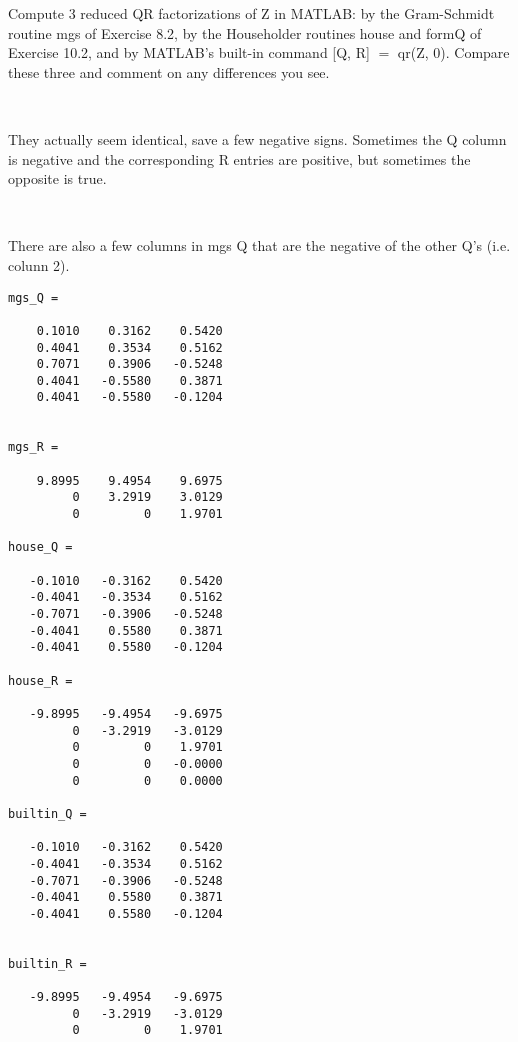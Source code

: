 \documentclass[12pt]{article}
\newcommand{\mt}[1]{\ensuremath{#1}}
\newcommand{\eql}{\mt{=} }
\begin{document}
Compute 3 reduced QR factorizations of Z in MATLAB: by the Gram-Schmidt routine mgs of Exercise 8.2, by the Householder routines house and formQ of Exercise 10.2, and by MATLAB's built-in command [Q, R] \eql qr(Z, 0). Compare these three and comment on any differences you see.

\

They actually seem identical, save a few negative signs. Sometimes the Q column is negative and the corresponding R entries are positive, but sometimes the opposite is true.

\

There are also a few columns in mgs Q that are the negative of the other Q's (i.e. colunn 2).

\begin{verbatim}
mgs_Q =

    0.1010    0.3162    0.5420
    0.4041    0.3534    0.5162
    0.7071    0.3906   -0.5248
    0.4041   -0.5580    0.3871
    0.4041   -0.5580   -0.1204


mgs_R =

    9.8995    9.4954    9.6975
         0    3.2919    3.0129
         0         0    1.9701

house_Q =

   -0.1010   -0.3162    0.5420
   -0.4041   -0.3534    0.5162
   -0.7071   -0.3906   -0.5248
   -0.4041    0.5580    0.3871
   -0.4041    0.5580   -0.1204
         
house_R =

   -9.8995   -9.4954   -9.6975
         0   -3.2919   -3.0129
         0         0    1.9701
         0         0   -0.0000
         0         0    0.0000

builtin_Q =

   -0.1010   -0.3162    0.5420
   -0.4041   -0.3534    0.5162
   -0.7071   -0.3906   -0.5248
   -0.4041    0.5580    0.3871
   -0.4041    0.5580   -0.1204


builtin_R =

   -9.8995   -9.4954   -9.6975
         0   -3.2919   -3.0129
         0         0    1.9701
\end{verbatim}
\end{document}
